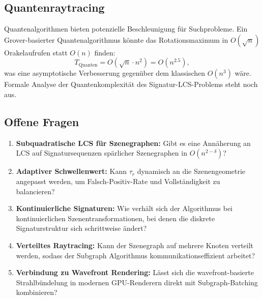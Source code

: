 ﻿\documentclass[a4paper,12pt]{article}
\theoremstyle{definition}
\begin{document}
\subsection{Quantenraytracing}

Quantenalgorithmen bieten potenzielle Beschleunigung für
Suchprobleme. Ein Grover-basierter Quantenalgorithmus
\citep{Grover1996} könnte das Rotationsmaximum in
$O(\sqrt{n})$ Orakelaufrufen statt $O(n)$ finden:
\[
  T_{\mathrm{Quanten}} = O(\sqrt{n} \cdot n^2) = O(n^{2.5}),
\]
was eine asymptotische Verbesserung gegenüber dem klassischen
$O(n^3)$ wäre. Formale Analyse der Quantenkomplexität des
Signatur-LCS-Problems steht noch aus.

\subsection{Offene Fragen}

\begin{enumerate}
  \item \textbf{Subquadratische LCS für Szenegraphen:} Gibt es
        eine Annäherung an LCS auf Signatursequenzen spärlicher
        Szenegraphen in $O(n^{2-\delta})$?
  \item \textbf{Adaptiver Schwellenwert:} Kann $\tau_r$ dynamisch
        an die Szenengeometrie angepasst werden, um
        Falsch-Positiv-Rate und Vollständigkeit zu balancieren?
  \item \textbf{Kontinuierliche Signaturen:} Wie verhält sich der
        Algorithmus bei kontinuierlichen Szenentransformationen,
        bei denen die diskrete Signaturstruktur sich schrittweise
        ändert?
  \item \textbf{Verteiltes Raytracing:} Kann der Szenegraph auf
        mehrere Knoten verteilt werden, sodass der Subgraph
        Algorithmus kommunikationseffizient arbeitet?
  \item \textbf{Verbindung zu Wavefront Rendering:} Lässt sich
        die wavefront-basierte Strahlbündelung in modernen
        GPU-Renderern direkt mit Subgraph-Batching kombinieren?
\end{enumerate}
\end{document}
